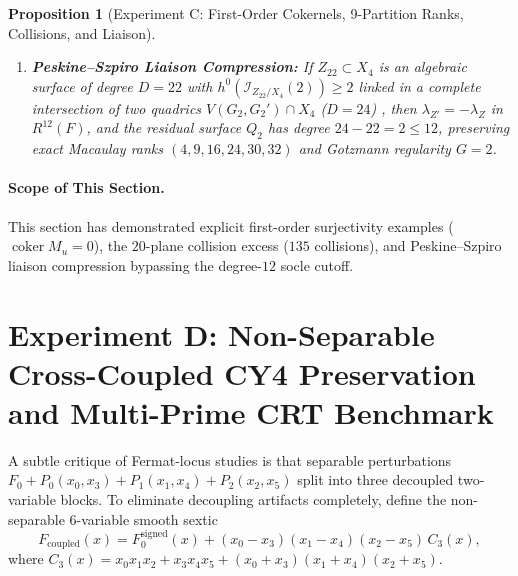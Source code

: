 \documentclass[11pt,a4paper]{amsart}
\newtheorem{proposition}[theorem]{Proposition}
\theoremstyle{definition}
\theoremstyle{remark}
\DeclareMathOperator{\coker}{coker}
\begin{document}
\begin{proposition}[Experiment C: First-Order Cokernels, 9-Partition Ranks, Collisions, and Liaison]
\begin{enumerate}[label=(\roman*)]
\item \textbf{Peskine--Szpiro Liaison Compression:} If $Z_{22} \subset X_4$ is an algebraic surface of degree $D = 22$ with $h^0(\mathcal{I}_{Z_{22}/X_4}(2)) \ge 2$ linked in a complete intersection of two quadrics $V(G_2, G_2') \cap X_4$ ($D=24$) \cite{PeskineSzpiro1974}, then $\lambda_{Z'} = -\lambda_Z$ in $R^{12}(F)$, and the residual surface $Q_2$ has degree $24 - 22 = 2 \le 12$, preserving exact Macaulay ranks $(4,9,16,24,30,32)$ and Gotzmann regularity $G = 2$.
\end{enumerate}
\end{proposition}

\paragraph{Scope of This Section.}
This section has demonstrated explicit first-order surjectivity examples ($\coker M_u = 0$), the $20$-plane collision excess ($135$ collisions), and Peskine--Szpiro liaison compression bypassing the degree-$12$ socle cutoff.

\section{Experiment D: Non-Separable Cross-Coupled CY4 Preservation and Multi-Prime CRT Benchmark}
\label{sec:thmD}

A subtle critique of Fermat-locus studies is that separable perturbations $F_0 + P_0(x_0,x_3) + P_1(x_1,x_4) + P_2(x_2,x_5)$ split into three decoupled two-variable blocks. To eliminate decoupling artifacts completely, define the non-separable $6$-variable smooth sextic
\begin{equation}
\label{eq:Fcoupled}
F_{\mathrm{coupled}}(x) = F_0^{\mathrm{signed}}(x) + (x_0 - x_3)(x_1 - x_4)(x_2 - x_5)\, C_3(x),
\end{equation}
where $C_3(x) = x_0 x_1 x_2 + x_3 x_4 x_5 + (x_0+x_3)(x_1+x_4)(x_2+x_5)$.
\end{document}
